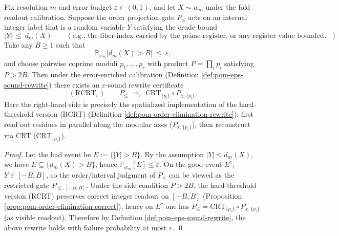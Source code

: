 \begin{proposition}\label{prop:pom-rcrt-epsilon}
Fix resolution \(m\) and error budget \(\varepsilon\in(0,1)\), and let \(X\sim w_m\) under the fold readout calibration.
Suppose the order projection gate \(P_{\le}\) acts on an internal integer label that is a random variable \(Y\) satisfying the crude bound
\[
|Y|\ \le\ d_m(X)
\qquad(\text{e.g., the fiber-index carried by the prime-register, or any register value bounded by fiber size}).
\]
Take any \(B\ge 1\) such that
\[
\mathbb{P}_{w_m}\big[d_m(X)>B\big]\ \le\ \varepsilon,
\]
and choose pairwise coprime moduli \(p_1,\dots,p_r\) with product \(P=\prod_i p_i\) satisfying \(P>2B\).
Then under the error-enriched calibration (Definition \ref{def:pom-eps-sound-rewrite}) there exists an \(\varepsilon\)-sound rewrite certificate
\[
(\mathrm{RCRT}_\varepsilon)\qquad
P_{\le}\ \Longrightarrow_{\varepsilon}\ \mathrm{CRT}_{\{p_i\}}\circ P_{\chi,\{p_i\}}.
\]
Here the right-hand side is precisely the spatialized implementation of the hard-threshold version (RCRT) (Definition \ref{def:pom-order-elimination-rewrite}): first read out residues in parallel along the modular axes (\(P_{\chi,\{p_i\}}\)), then reconstruct via CRT (\(\mathrm{CRT}_{\{p_i\}}\)).
\end{proposition}
\begin{proof}
Let the bad event be \(E:=\{|Y|>B\}\).
By the assumption \(|Y|\le d_m(X)\), we have \(E\subseteq\{d_m(X)>B\}\), hence
\(
\mathbb{P}_{w_m}[E]\le \varepsilon
\).
On the good event \(E^c\), \(Y\in[-B,B]\), so the order/interval judgment of \(P_{\le}\) can be viewed as the restricted gate \(P_{\le,[-B,B]}\).
Under the side condition \(P>2B\), the hard-threshold version (RCRT) preserves correct integer readout on \([-B,B]\) (Proposition \ref{prop:pom-order-elimination-correct}), hence on \(E^c\) one has
\(
P_{\le}= \mathrm{CRT}_{\{p_i\}}\circ P_{\chi,\{p_i\}}
\)
(as visible readout).
Therefore by Definition \ref{def:pom-eps-sound-rewrite}, the above rewrite holds with failure probability at most \(\varepsilon\). \qed
\end{proof}
